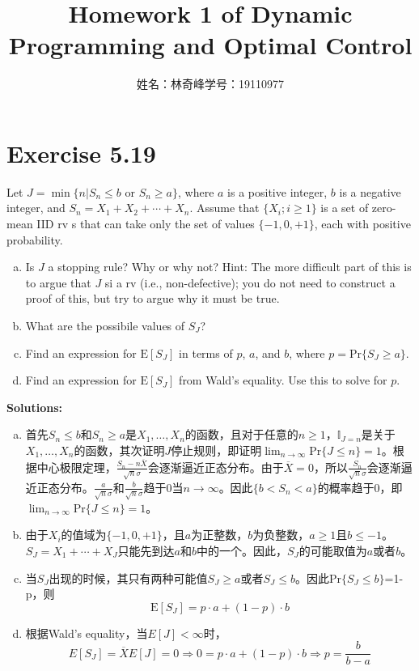 \documentclass{article}
\begin{document}
    \title{Homework 1 of Dynamic Programming and Optimal Control}
    \author{姓名：林奇峰\qquad 学号：19110977}
    \maketitle

    
    \section{Exercise 5.19}
    Let $J=\min\{n|S_n\leq b\text{ or } S_n\geq a\}$, where $a$ is a positive integer, $b$ is a negative integer, and $S_n=X_1+X_2+\cdots+X_n$. Assume that $\{X_i;i\geq 1\}$ is a set of zero-mean IID rv s that can take only the set of values $\{-1,0,+1\}$, each with positive probability.
    \begin{enumerate}[(a)]
        \item Is $J$ a stopping rule? Why or why not? Hint: The more difficult part of this is to argue that $J$  si a rv (i.e., non-defective); you do not need to construct a proof of this, but try to argue why it must be true.
        \item What are the possibile values of $S_J$?
        \item Find an expression for $\text{E}[S_J]$ in terms of $p$, $a$, and $b$, where $p=\text{Pr}\{S_J\geq a\}$.
        \item Find an expression for $\text{E}[S_J]$ from Wald's equality. Use this to solve for $p$.
    \end{enumerate}

    \textbf{Solutions:}
    \begin{enumerate}[(a)]
        \item 首先$S_n\leq b$和$S_n\geq a$是$X_1,\dots,X_n$的函数，且对于任意的$n\geq 1$，$\mathbb{I}_{J=n}$是关于$X_1,\dots,X_n$的函数，其次证明$J$停止规则，即证明$\lim_{n\rightarrow\infty}\text{Pr}\{J\leq n\}=1$。根据中心极限定理，$\frac{S_n-n\overline{X}}{\sqrt{n}\sigma}$会逐渐逼近正态分布。由于$\overline{X}=0$，所以$\frac{S_n}{\sqrt{n}\sigma}$会逐渐逼近正态分布。$\frac{a}{\sqrt{n}\sigma}$和$\frac{b}{\sqrt{n}\sigma}$趋于0当$n\rightarrow\infty$。因此$\{b<S_n<a\}$的概率趋于0，即$\lim_{n\rightarrow\infty}\text{Pr}\{J\leq n\}=1$。
        \item 由于$X_i$的值域为$\{-1,0,+1\}$，且$a$为正整数，$b$为负整数，$a\geq 1$且$b\leq -1$。$S_J=X_1+\cdots+X_J$只能先到达$a$和$b$中的一个。因此，$S_J$的可能取值为$a$或者$b$。
        \item 当$S_J$出现的时候，其只有两种可能值$S_J\geq a$或者$S_J\leq b$。因此$\text{Pr}\{S_J\leq b\}$=1-p，则
        \begin{equation*}
            \text{E}[S_J]=p\cdot a+(1-p)\cdot b
        \end{equation*}
        \item 根据Wald's equality，当$E[J]<\infty$时，
        \begin{equation*}
            E[S_J]=\overline{X}E[J]=0\Rightarrow 0=p\cdot a+(1-p)\cdot b\Rightarrow p=\frac{b}{b-a}
        \end{equation*}
    \end{enumerate}
\end{document}
